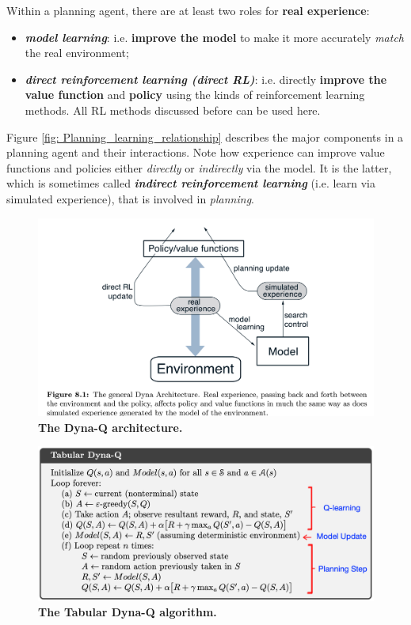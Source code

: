 \documentclass[11pt]{article}
\begin{document}
Within a planning agent, there are at least two roles for \textbf{real experience}: 
\begin{itemize}
\item \textbf{\emph{model learning}}: i.e.   \textbf{improve the model} to make it more accurately \emph{match} the real environment;
\item \textbf{\emph{direct reinforcement learning (direct RL)}}: i.e. directly \textbf{improve the value function} and \textbf{policy} using the kinds of reinforcement learning methods. All RL methods discussed before can be used here. 
\end{itemize} Figure \ref{fig: Planning_learning_relationship} describes the major components in a planning agent and their interactions.  Note how experience can improve value functions and policies either \emph{directly} or \emph{indirectly} via the model. It is the latter, which is sometimes called \textbf{\emph{indirect reinforcement learning}} (i.e. learn via simulated experience), that is involved in \emph{planning}.
\begin{figure}
\begin{minipage}[t]{1\linewidth}
  \centering
  \centerline{\includegraphics[scale = 0.3]{Dyna_Q.png}}
\end{minipage}
\caption{\footnotesize{\textbf{The Dyna-Q architecture. }}}
\label{fig: Dyna_Q}
\end{figure}
\begin{figure}
\begin{minipage}[t]{1\linewidth}
  \centering
  \centerline{\includegraphics[scale = 0.18]{Tabular_Dyna_Q_alg_notes.png}}
\end{minipage}
\caption{\footnotesize{\textbf{The Tabular Dyna-Q algorithm. }}}
\label{fig: Tabular_Dyna_Q_alg}
\end{figure}
\end{document}
